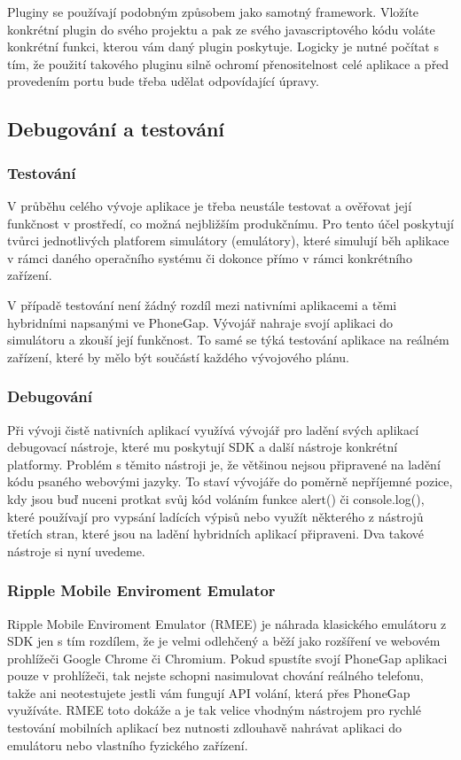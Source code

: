Pluginy se používají podobným způsobem jako samotný framework. Vložíte konkrétní plugin do svého projektu a pak ze svého javascriptového kódu voláte konkrétní funkci, kterou vám daný plugin poskytuje. Logicky je nutné počítat s tím, že použití takového pluginu silně ochromí přenositelnost celé aplikace a před provedením portu bude třeba udělat odpovídající úpravy.

\subsection{Debugování a testování}
\subsubsection{Testování}
V průběhu celého vývoje aplikace je třeba neustále testovat a ověřovat její funkčnost v prostředí, co možná nejbližším produkčnímu. Pro tento účel poskytují tvůrci jednotlivých platforem simulátory (emulátory), které simulují běh aplikace v rámci daného operačního systému či dokonce přímo v rámci konkrétního zařízení.

V případě testování není žádný rozdíl mezi nativními aplikacemi a těmi hybridními napsanými ve PhoneGap. Vývojář nahraje svojí aplikaci do simulátoru a zkouší její funkčnost. To samé se týká testování aplikace na reálném zařízení, které by mělo být součástí každého vývojového plánu.

\subsubsection{Debugování}
Při vývoji čistě nativních aplikací využívá vývojář pro ladění svých aplikací debugovací nástroje, které mu poskytují SDK a další nástroje konkrétní platformy. Problém s těmito nástroji je, že většinou nejsou připravené na ladění kódu psaného webovými jazyky. To staví vývojáře do poměrně nepříjemné pozice, kdy jsou buď nuceni protkat svůj kód voláním funkce alert() či console.log(), které používají pro vypsání ladících výpisů nebo využít některého z nástrojů třetích stran, které jsou na ladění hybridních aplikací připraveni. Dva takové nástroje si nyní uvedeme.

\subsubsection{Ripple Mobile Enviroment Emulator}
Ripple Mobile Enviroment Emulator (RMEE) je náhrada klasického emulátoru z SDK jen s tím rozdílem, že je velmi odlehčený a běží jako rozšíření ve webovém prohlížeči Google Chrome či Chromium. Pokud spustíte svojí PhoneGap aplikaci pouze v prohlížeči, tak nejste schopni nasimulovat chování reálného telefonu, takže ani neotestujete jestli vám fungují API volání, která přes PhoneGap využíváte. RMEE toto dokáže a je tak velice vhodným nástrojem pro rychlé testování mobilních aplikací bez nutnosti zdlouhavě nahrávat aplikaci do emulátoru nebo vlastního fyzického zařízení.

